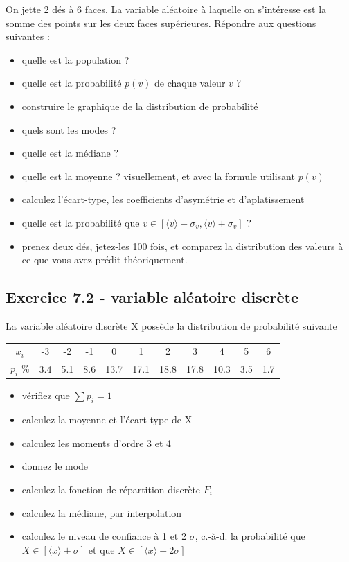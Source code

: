 On jette 2 dés à 6 faces. La variable aléatoire à laquelle on s'intéresse est la somme des points sur les deux faces supérieures. Répondre aux questions suivantes :
\begin{itemize}
\item quelle est la population ?
\item quelle est la probabilité $p(v)$ de chaque valeur $v$ ?
\item construire le graphique de la distribution de probabilité
\item quels sont les modes ?
\item quelle est la médiane ?
\item quelle est la moyenne ? visuellement, et avec la formule utilisant $p(v)$
\item calculez l'écart-type, les coefficients d'asymétrie et d'aplatissement
\item quelle est la probabilité que $v\in[\langle v \rangle-\sigma_v,\langle v \rangle+\sigma_v]$ ?
\item prenez deux dés, jetez-les 100 fois, et comparez la distribution des valeurs à ce que vous avez prédit théoriquement.
\end{itemize}

\subsection*{Exercice 7.2 - variable aléatoire discrète}

La variable aléatoire discrète X possède la distribution de probabilité suivante
\begin{center}
\begin{tabular}{c|cccccccccc}
$x_i$    &  -3 &   -2 &   -1 &    0 & 1    & 2    & 3    & 4    & 5   & 6\\
$p_i$ \% & 3.4 & 5.1 & 8.6 & 13.7 & 17.1 & 18.8 & 17.8 & 10.3 & 3.5 & 1.7
\end{tabular}
\end{center}
\begin{itemize}
\item vérifiez que $\sum p_i=1$
\item calculez la moyenne et l'écart-type de X
\item calculez les moments d'ordre 3 et 4
\item donnez le mode
\item calculez la fonction de répartition discrète $F_i$
\item calculez la médiane, par interpolation
\item calculez le niveau de confiance à 1 et 2 $\sigma$, c.-à-d. la probabilité que $X\in[\langle x\rangle\pm\sigma]$ et que $X\in[\langle x\rangle\pm2\sigma]$
\end{itemize}

